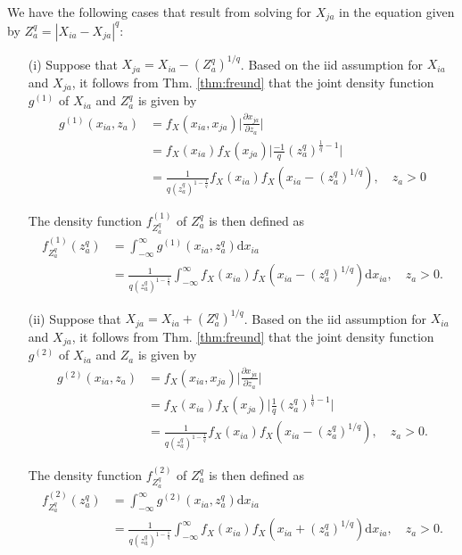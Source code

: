 \documentclass[aos]{imsart}
\begin{document}
We have the following cases that result from solving for $X_{ja}$ in the equation given by $Z^q_a = |X_{ia} - X_{ja}|^q$:
\begin{itemize}
	\item[(i)] Suppose that $X_{ja} = X_{ia} - \left(Z^q_a\right)^{1/q}$. Based on the iid assumption for $X_{ia}$ and $X_{ja}$, it follows from Thm. \ref{thm:freund} that the joint density function $g^{(1)}$ of $X_{ia}$ and $Z^q_a$ is given by
	\begin{equation}
	\begin{aligned}
	g^{(1)}(x_{ia},z_a) &= f_X(x_{ia},x_{ja})\biggl|\frac{\partial x_{ja}}{\partial z_a}\biggr| \\
	&= f_X(x_{ia})f_X(x_{ja})\biggl|\frac{-1}{q} \left(z^q_a\right)^{\frac{1}{q}-1}\biggr| \\
	&= \frac{1}{q \left(z^q_a\right)^{1 - \frac{1}{q}}}f_X(x_{ia})f_X\left(x_{ia}-\left(z^q_a\right)^{1/q}\right), \quad z_a > 0
	\end{aligned}
	\end{equation}
	
	The density function $f^{(1)}_{Z^q_a}$ of $Z^q_a$ is then defined as
	\begin{equation}
	\begin{aligned}
	f^{(1)}_{Z^q_a}(z^q_a) &= \int_{-\infty}^{\infty} g^{(1)}(x_{ia},z^q_a)\text{d}x_{ia} \\
	&= \frac{1}{q \left(z^q_a\right)^{1 - \frac{1}{q}}}\int_{-\infty}^{\infty} f_X(x_{ia})f_X\left(x_{ia}-\left(z^q_a\right)^{1/q}\right)\text{d}x_{ia}, \quad z_a > 0.
	\end{aligned}
	\end{equation}
	
	\item[(ii)] Suppose that $X_{ja} = X_{ia} + \left(Z^q_a\right)^{1/q}$. Based on the iid assumption for $X_{ia}$ and $X_{ja}$, it follows from Thm. \ref{thm:freund} that the joint density function $g^{(2)}$ of $X_{ia}$ and $Z_a$ is given by
	\begin{equation}
	\begin{aligned}
	g^{(2)}(x_{ia},z_a) &= f_X(x_{ia},x_{ja})\biggl|\frac{\partial x_{ja}}{\partial z_a}\biggr| \\
	&= f_X(x_{ia})f_X(x_{ja})\biggl|\frac{1}{q} \left(z^q_a\right)^{\frac{1}{q}-1}\biggr| \\
	&= \frac{1}{q \left(z^q_a\right)^{1 - \frac{1}{q}}}f_X(x_{ia})f_X\left(x_{ia}-\left(z^q_a\right)^{1/q}\right), \quad z_a > 0.
	\end{aligned}
	\end{equation}
	
	The density function $f^{(2)}_{Z^q_a}$ of $Z^q_a$ is then defined as
	\begin{equation}
	\begin{aligned}
	f^{(2)}_{Z^q_a}(z^q_a) &= \int_{-\infty}^{\infty} g^{(2)}(x_{ia},z^q_a)\text{d}x_{ia} \\
	&= \frac{1}{q \left(z^q_a\right)^{1 - \frac{1}{q}}}\int_{-\infty}^{\infty} f_X(x_{ia})f_X\left(x_{ia}+\left(z^q_a\right)^{1/q}\right)\text{d}x_{ia}, \quad z_a > 0.
	\end{aligned}
	\end{equation}
\end{itemize}
\end{document}
